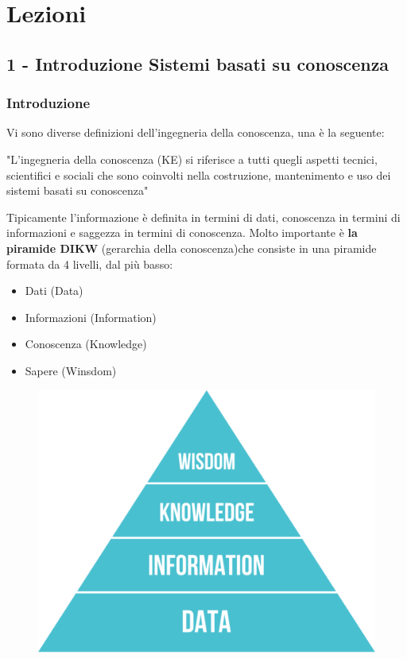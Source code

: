 \documentclass[a4paper]{extarticle}
\begin{document}
\newpage 
\section{Lezioni}

\subsection{1 - Introduzione Sistemi basati su conoscenza}

\subsubsection{Introduzione}

Vi sono diverse definizioni dell'ingegneria della conoscenza, una è la seguente:

\begin{center}
	"L'ingegneria della conoscenza (KE) si riferisce a tutti quegli aspetti tecnici, scientifici e sociali che sono coinvolti nella costruzione, mantenimento e uso dei sistemi basati su conoscenza"
\end{center}

Tipicamente l'informazione è definita in termini di dati, conoscenza in termini di informazioni e saggezza in termini di conoscenza. Molto importante è \textbf{la piramide DIKW} (gerarchia della conoscenza)che consiste in una piramide formata da 4 livelli, dal più basso:
\begin{itemize}
	\item Dati (Data)
	\item  Informazioni (Information)
	\item Conoscenza (Knowledge)
	\item Sapere (Winsdom)
\end{itemize}

\begin{figure}[h]
\begin{center}
\includegraphics[scale=.3]{wkid.png}
\end{center}

\end{figure}
\end{document}

